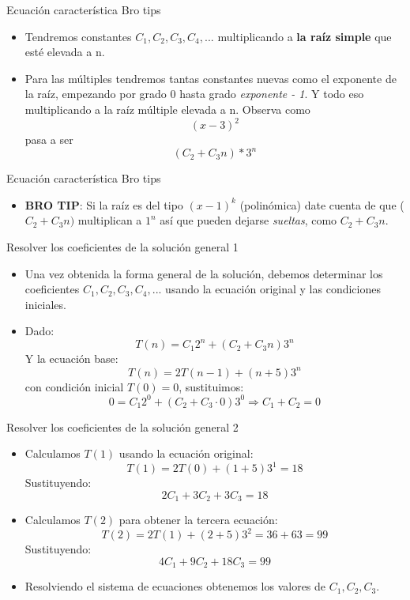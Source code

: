 \documentclass[aspectratio=169]{beamer}
\begin{document}
\begin{frame}{Ecuación característica Bro tips}
\begin{itemize}
    \item Tendremos constantes \( C_1, C_2, C_3, C_4, ... \) multiplicando a \textbf{la raíz simple} que esté elevada a n.
    \item Para las múltiples tendremos tantas constantes nuevas como el exponente de la raíz, empezando por grado 0 hasta grado \textit{exponente - 1}. Y todo eso multiplicando a la raíz múltiple elevada a n. Observa como \[ (x-3)^2\] pasa a ser \[(C_2 + C_3n)*3^n\]

   
\end{itemize}
\end{frame}


\begin{frame}{Ecuación característica Bro tips}
\begin{itemize}
       \item \textbf{BRO TIP}: Si la raíz es del tipo \((x-1)^k\) (polinómica) date cuenta de que (\(C_2 + C_3n)\) multiplican a \(1^n\) así que pueden dejarse \textit{sueltas}, como \(C_2 + C_3n\).
   
\end{itemize}
\end{frame}

\begin{frame}{Resolver los coeficientes de la solución general 1}
\begin{itemize}
    \item Una vez obtenida la forma general de la solución, debemos determinar los coeficientes  \( C_1, C_2, C_3, C_4, ... \) usando la ecuación original y las condiciones iniciales.
    
    \item Dado:
    \[
    T(n) = C_1 2^n + (C_2 + C_3n) 3^n
    \]
    Y la ecuación base:
    \[
    T(n) = 2T(n-1) + (n+5)3^n
    \]
    con condición inicial \( T(0) = 0 \), sustituimos:
    \[
    0 = C_1 2^0 + (C_2 + C_3 \cdot 0) 3^0 \Rightarrow C_1 + C_2 = 0
    \]
    
   
\end{itemize}
\end{frame}


\begin{frame}{Resolver los coeficientes de la solución general 2}
\begin{itemize}
 \item Calculamos \( T(1) \) usando la ecuación original:
    \[
    T(1) = 2T(0) + (1+5)3^1 = 18
    \]
    Sustituyendo:
    \[
    2C_1 + 3C_2 + 3C_3 = 18
    \]
    
    \item Calculamos \( T(2) \) para obtener la tercera ecuación:
    \[
    T(2) = 2T(1) + (2+5)3^2 = 36 + 63 = 99
    \]
    Sustituyendo:
    \[
    4C_1 + 9C_2 + 18C_3 = 99
    \]
    
    \item Resolviendo el sistema de ecuaciones obtenemos los valores de \( C_1, C_2, C_3 \).
\end{itemize}
\end{frame}
\end{document}
